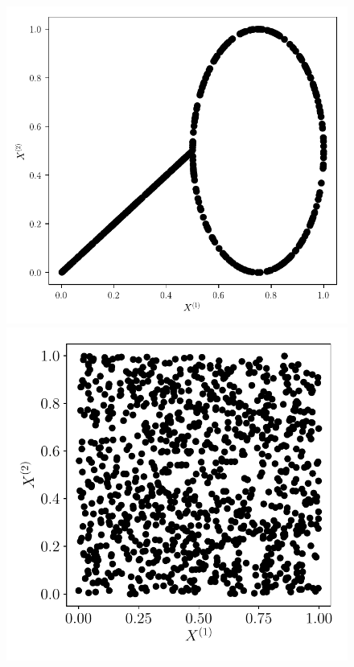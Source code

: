 \documentclass[../main]{subfiles}
\begin{document}
\begin{figure}
\begin{minipage}{\textwidth}
\begin{minipage}{0.33\textwidth}
		\end{minipage}
		\begin{minipage}{0.33\textwidth}
			\includegraphics[width=\textwidth]{2som_mix001_in.pdf}
		\end{minipage}
		\begin{minipage}{0.33\textwidth}
			\includegraphics[width=\textwidth]{2som_square_in.pdf}
		\end{minipage}
	\end{minipage}
	
\end{figure}
\end{document}
